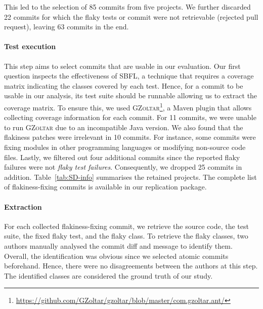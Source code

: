 This led to the selection of 85 commits from five projects. We further discarded 22 commits for which the flaky tests or commit were not retrievable (\eg rejected pull request), leaving 63 commits in the end. 


\paragraph{Test execution}
This step aims to select commits that are usable in our evaluation.
Our first question inspects the effectiveness of SBFL, a technique that requires a coverage matrix indicating the classes covered by each test.
Hence, for a commit to be usable in our analysis, its test suite should be runnable allowing us to extract the coverage matrix.
To ensure this, we used  \textsc{GZoltar}\footnote{\url{https://github.com/GZoltar/gzoltar/blob/master/com.gzoltar.ant/}}, a Maven plugin that allows collecting coverage information for each commit.
For 11 commits, we were unable to run \textsc{GZoltar} due to an incompatible Java version. We also found that the flakiness patches were irrelevant in 10 commits.
For instance, some commits were fixing modules in other programming languages or modifying non-source code files.
Lastly, we filtered out four additional commits since the reported flaky failures were not \textit{flaky test failures}.
Consequently, %
we dropped 25 commits in addition. Table~\ref{tab:SD-info} summarises the retained projects.
The complete list of flakiness-fixing commits is available in our replication package. 

\paragraph{Extraction}
For each collected flakiness-fixing commit, we retrieve the source code, the test suite, the fixed flaky test, and the flaky class. To retrieve the flaky classes, two authors manually analysed the commit diff and message to identify them.
Overall, the identification was obvious since we selected atomic commits beforehand.
Hence, there were no disagreements between the authors at this step.
The identified classes are considered the ground truth of our study. 

